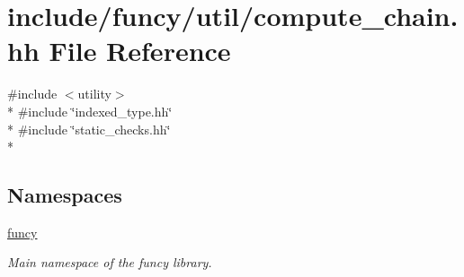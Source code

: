 \hypertarget{compute__chain_8hh}{\section{include/funcy/util/compute\-\_\-chain.hh File Reference}
\label{compute__chain_8hh}
}
{\ttfamily \#include $<$utility$>$}\\*
{\ttfamily \#include \char`\"{}indexed\-\_\-type.\-hh\char`\"{}}\\*
{\ttfamily \#include \char`\"{}static\-\_\-checks.\-hh\char`\"{}}\\*
\subsection*{Namespaces}
\begin{DoxyCompactItemize}
\item 
\hyperlink{namespacefuncy}{funcy}
\begin{DoxyCompactList}\small\item\em Main namespace of the funcy library. \end{DoxyCompactList}\end{DoxyCompactItemize}
